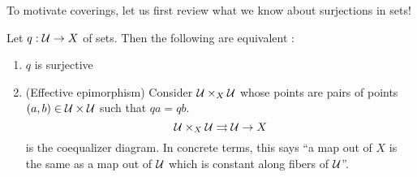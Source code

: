 \documentclass[./main.tex]{subfiles}
\begin{document}
To motivate coverings,
let us first review what we know about surjections in sets!

\begin{prop}
  
  Let $q : \mathcal{U} \to X$ of sets.
  Then the following are equivalent : 
  \begin{enumerate}
    \item $q$ is surjective
    \item (Effective epimorphism) Consider $\mathcal{U} \times_X \mathcal{U}$ whose points are
    pairs of points $(a , b) \in \mathcal{U} \times \mathcal{U}$ such that
    $q a = q b$.
    \[
      \mathcal{U} \times_X \mathcal{U} \rightrightarrows \mathcal{U} \to X
    \]
    is the coequalizer diagram.
    In concrete terms,
    this says ``a map out of $X$ is the same as
    a map out of $\mathcal{U}$ which is constant along fibers of $\mathcal{U}$''.
  \end{enumerate}
\end{prop}
\end{document}
